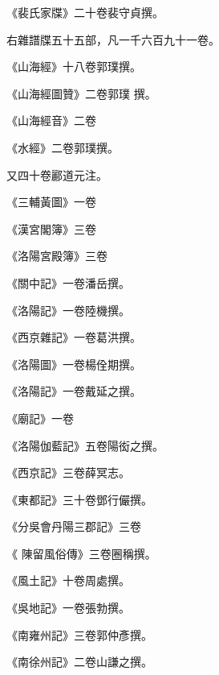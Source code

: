 \begin{pinyinscope}
 《裴氏家牒》二十卷裴守貞撰。



 右雜譜牒五十五部，凡一千六百九十一卷。



 《山海經》十八卷郭璞撰。



 《山海經圖贊》二卷郭璞
 撰。



 《山海經音》二卷



 《水經》二卷郭璞撰。



 又四十卷酈道元注。



 《三輔黃圖》一卷



 《漢宮閣簿》三卷



 《洛陽宮殿簿》三卷



 《關中記》一卷潘岳撰。



 《洛陽記》一卷陸機撰。



 《西京雜記》一卷葛洪撰。



 《洛陽圖》一卷楊佺期撰。



 《洛陽記》一卷戴延之撰。



 《廟記》一卷



 《洛陽伽藍記》五卷陽衒之撰。



 《西京記》三卷薛冥志。



 《東都記》三十卷鄧行儼撰。



 《分吳會丹陽三郡記》三卷



 《
 陳留風俗傳》三卷圈稱撰。



 《風土記》十卷周處撰。



 《吳地記》一卷張勃撰。



 《南雍州記》三卷郭仲彥撰。



 《南徐州記》二卷山謙之撰。




\end{pinyinscope}
